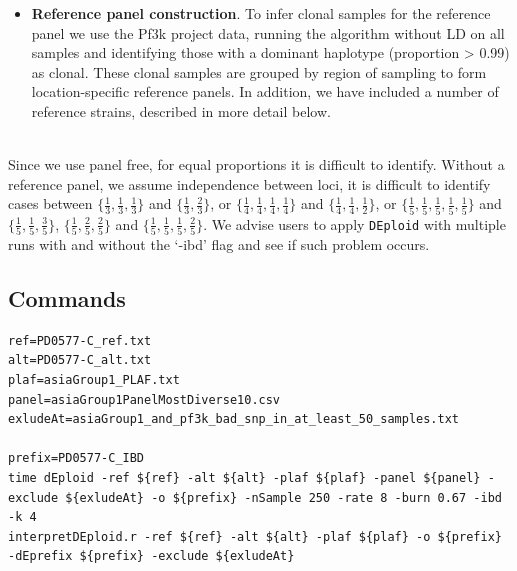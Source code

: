 \documentclass[9pt,lineno]{elife}
\begin{document}
\begin{itemize}
\begin{itemize}
\item {\bf Reference panel construction}. To infer clonal samples for the reference panel we use the Pf3k project data, running the algorithm without LD on all samples and identifying those with a dominant haplotype (proportion > 0.99) as clonal.  These clonal samples are grouped by region of sampling to form location-specific reference panels.  In addition, we have included a number of reference strains, described in more detail below.

\end{itemize}



\end{itemize}



\\
Since we use panel free, for equal proportions it is difficult to identify.
Without a reference panel, we assume independence between loci, it is difficult to identify cases between $\{\frac{1}{3},\frac{1}{3},\frac{1}{3}\}$ and $\{\frac{1}{3},\frac{2}{3}\}$, or
$\{\frac{1}{4},\frac{1}{4}, \frac{1}{4}, \frac{1}{4}\}$ and $\{\frac{1}{4},\frac{1}{4}, \frac{1}{2}\}$, or $\{\frac{1}{5},\frac{1}{5}, \frac{1}{5}, \frac{1}{5}, \frac{1}{5}\}$ and $\{\frac{1}{5},\frac{1}{5}, \frac{3}{5}\}$, $\{\frac{1}{5},\frac{2}{5}, \frac{2}{5}\}$ and
$\{\frac{1}{5},\frac{1}{5}, \frac{1}{5}, \frac{2}{5}\}$. We advise users to apply {\tt DEploid} with multiple runs with and without the `-ibd' flag and see if such problem occurs.


\subsection{Commands}

\linespread{1}
\begin{lstlisting}
ref=PD0577-C_ref.txt
alt=PD0577-C_alt.txt
plaf=asiaGroup1_PLAF.txt
panel=asiaGroup1PanelMostDiverse10.csv
exludeAt=asiaGroup1_and_pf3k_bad_snp_in_at_least_50_samples.txt

prefix=PD0577-C_IBD
time dEploid -ref ${ref} -alt ${alt} -plaf ${plaf} -panel ${panel} -exclude ${exludeAt} -o ${prefix} -nSample 250 -rate 8 -burn 0.67 -ibd -k 4
interpretDEploid.r -ref ${ref} -alt ${alt} -plaf ${plaf} -o ${prefix} -dEprefix ${prefix} -exclude ${exludeAt}
\end{lstlisting}
\end{document}
